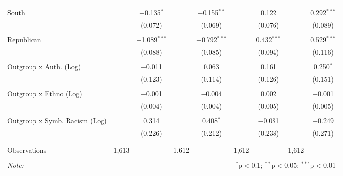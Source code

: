 \begin{table}[H]
{\begin{tabular}{@{\extracolsep{5pt}}lcccccccc}
  & & & & & & & & \\ 
 South &  & $-$0.135$^{*}$ &  & $-$0.155$^{**}$ &  & 0.122 &  & 0.292$^{***}$ \\ 
  &  & (0.072) &  & (0.069) &  & (0.076) &  & (0.089) \\ 
  & & & & & & & & \\ 
 Republican &  & $-$1.089$^{***}$ &  & $-$0.792$^{***}$ &  & 0.432$^{***}$ &  & 0.529$^{***}$ \\ 
  &  & (0.088) &  & (0.085) &  & (0.094) &  & (0.116) \\ 
  & & & & & & & & \\ 
 Outgroup x Auth. (Log) &  & $-$0.011 &  & 0.063 &  & 0.161 &  & 0.250$^{*}$ \\ 
  &  & (0.123) &  & (0.114) &  & (0.126) &  & (0.151) \\ 
  & & & & & & & & \\ 
 Outgroup x Ethno (Log) &  & $-$0.001 &  & $-$0.004 &  & 0.002 &  & $-$0.001 \\ 
  &  & (0.004) &  & (0.004) &  & (0.005) &  & (0.005) \\ 
  & & & & & & & & \\ 
 Outgroup x Symb. Racism (Log) &  & 0.314 &  & 0.408$^{*}$ &  & $-$0.081 &  & $-$0.249 \\ 
  &  & (0.226) &  & (0.212) &  & (0.238) &  & (0.271) \\ 
  & & & & & & & & \\ 
\hline \\[-1.8ex] 
Observations & 1,613 &  & 1,612 &  & 1,612 &  & 1,612 &  \\ 
\hline 
\hline \\[-1.8ex] 
\textit{Note:}  & \multicolumn{8}{r}{$^{*}$p$<$0.1; $^{**}$p$<$0.05; $^{***}$p$<$0.01} \\ 
\end{tabular}} 
\end{table} 
